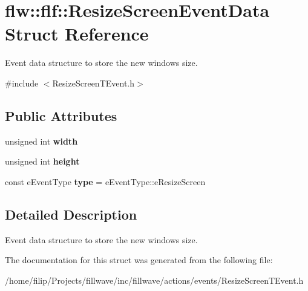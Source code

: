 \hypertarget{structflw_1_1flf_1_1ResizeScreenEventData}{}\section{flw\+:\+:flf\+:\+:Resize\+Screen\+Event\+Data Struct Reference}
\label{structflw_1_1flf_1_1ResizeScreenEventData}


Event data structure to store the new windows size.  




{\ttfamily \#include $<$Resize\+Screen\+T\+Event.\+h$>$}

\subsection*{Public Attributes}
\begin{DoxyCompactItemize}
\item 
unsigned int {\bfseries width}\hypertarget{structflw_1_1flf_1_1ResizeScreenEventData_a9977f0375cafe636a0ece33ec2d82aee}{}\label{structflw_1_1flf_1_1ResizeScreenEventData_a9977f0375cafe636a0ece33ec2d82aee}

\item 
unsigned int {\bfseries height}\hypertarget{structflw_1_1flf_1_1ResizeScreenEventData_ab42ad852f00d520acdb7bba360a02f63}{}\label{structflw_1_1flf_1_1ResizeScreenEventData_ab42ad852f00d520acdb7bba360a02f63}

\item 
const e\+Event\+Type {\bfseries type} = e\+Event\+Type\+::e\+Resize\+Screen\hypertarget{structflw_1_1flf_1_1ResizeScreenEventData_aba6780b72596499bbb2a8452e876abe5}{}\label{structflw_1_1flf_1_1ResizeScreenEventData_aba6780b72596499bbb2a8452e876abe5}

\end{DoxyCompactItemize}


\subsection{Detailed Description}
Event data structure to store the new windows size. 

The documentation for this struct was generated from the following file\+:\begin{DoxyCompactItemize}
\item 
/home/filip/\+Projects/fillwave/inc/fillwave/actions/events/Resize\+Screen\+T\+Event.\+h\end{DoxyCompactItemize}

